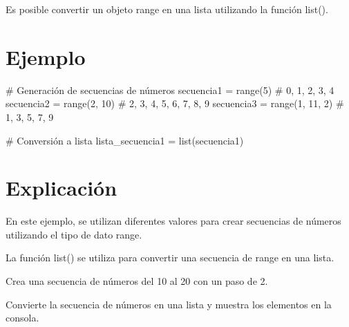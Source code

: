 \documentclass[
  a4paper,
  onepage,
  openany]{scrreprt}
\newenvironment{Shaded}{\begin{snugshade}}{\end{snugshade}}
\newcommand{\BuiltInTok}[1]{\textcolor[rgb]{0.00,0.23,0.31}{#1}}
\newcommand{\CommentTok}[1]{\textcolor[rgb]{0.37,0.37,0.37}{#1}}
\newcommand{\DecValTok}[1]{\textcolor[rgb]{0.68,0.00,0.00}{#1}}
\newcommand{\NormalTok}[1]{\textcolor[rgb]{0.00,0.23,0.31}{#1}}
\newcommand{\OperatorTok}[1]{\textcolor[rgb]{0.37,0.37,0.37}{#1}}
\begin{document}
Es posible convertir un objeto range en una lista utilizando la función
list().

\hypertarget{ejemplo-22}{%
\section{Ejemplo}\label{ejemplo-22}}

\begin{Shaded}
\begin{Highlighting}[]
\CommentTok{\# Generación de secuencias de números}
\NormalTok{secuencia1 }\OperatorTok{=} \BuiltInTok{range}\NormalTok{(}\DecValTok{5}\NormalTok{)          }\CommentTok{\# 0, 1, 2, 3, 4}
\NormalTok{secuencia2 }\OperatorTok{=} \BuiltInTok{range}\NormalTok{(}\DecValTok{2}\NormalTok{, }\DecValTok{10}\NormalTok{)      }\CommentTok{\# 2, 3, 4, 5, 6, 7, 8, 9}
\NormalTok{secuencia3 }\OperatorTok{=} \BuiltInTok{range}\NormalTok{(}\DecValTok{1}\NormalTok{, }\DecValTok{11}\NormalTok{, }\DecValTok{2}\NormalTok{)   }\CommentTok{\# 1, 3, 5, 7, 9}

\CommentTok{\# Conversión a lista}
\NormalTok{lista\_secuencia1 }\OperatorTok{=} \BuiltInTok{list}\NormalTok{(secuencia1)}
\end{Highlighting}
\end{Shaded}

\hypertarget{explicaciuxf3n-22}{%
\section{Explicación}\label{explicaciuxf3n-22}}

En este ejemplo, se utilizan diferentes valores para crear secuencias de
números utilizando el tipo de dato range.

La función list() se utiliza para convertir una secuencia de range en
una lista.

\begin{tcolorbox}[enhanced jigsaw, breakable, opacityback=0, toptitle=1mm, coltitle=black, toprule=.15mm, rightrule=.15mm, colframe=quarto-callout-important-color-frame, opacitybacktitle=0.6, arc=.35mm, title=\textcolor{quarto-callout-important-color}{\faExclamation}\hspace{0.5em}{Actividad Práctica:}, titlerule=0mm, colbacktitle=quarto-callout-important-color!10!white, bottomtitle=1mm, bottomrule=.15mm, colback=white, left=2mm, leftrule=.75mm]

Crea una secuencia de números del 10 al 20 con un paso de 2.

Convierte la secuencia de números en una lista y muestra los elementos
en la consola.

\end{tcolorbox}
\end{document}
